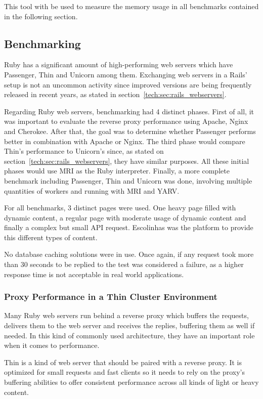 This tool with be used to measure the memory usage in all benchmarks contained in the following section.

\subsection{Benchmarking}
Ruby has a significant amount of high-performing web servers which have Passenger, Thin and Unicorn among them. Exchanging web servers in a Rails' setup is not an uncommon activity since improved versions are being frequently released in recent years, as stated in section~\ref{tech:sec:rails_webservers}.

Regarding Ruby web servers, benchmarking had 4 distinct phases. First of all, it was important to evaluate the reverse proxy performance using Apache, Nginx and Cherokee. After that, the goal was to determine whether Passenger performs better in combination with Apache or Nginx. The third phase would compare Thin's performance to Unicorn's since, as stated on section~\ref{tech:sec:rails_webservers}, they have similar purposes. All these initial phases would use MRI as the Ruby interpreter. Finally, a more complete benchmark including Passenger, Thin and Unicorn was done, involving multiple quantities of workers and running with MRI and YARV.

For all benchmarks, 3 distinct pages were used. One heavy page filled with dynamic content, a regular page with moderate usage of dynamic content and finally a complex but small API request. Escolinhas was the platform to provide this different types of content.

No database caching solutions were in use. Once again, if any request took more than 30 seconds to be replied to the test was considered a failure, as a higher response time is not acceptable in real world applications.

\subsubsection{Proxy Performance in a Thin Cluster Environment}
Many Ruby web servers run behind a reverse proxy which buffers the requests, delivers them to the web server and receives the replies, buffering them as well if needed. In this kind of commonly used architecture, they have an important role when it comes to performance.

Thin is a kind of web server that should be paired with a reverse proxy. It is optimized for small requests and fast clients so it needs to rely on the proxy's buffering abilities to offer consistent performance across all kinds of light or heavy content.

